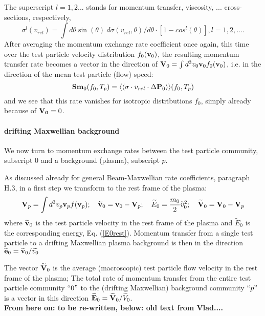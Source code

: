 \documentclass[12pt,dvipdfmx]{article}
\begin{document}
The superscript $l=1,2...$ stands for momentum transfer, viscosity,
... cross-sections, respectively,
\begin{equation}
\sigma^l(v_{rel}) = \int d\theta \sin(\theta) \ d\sigma(v_{rel},\theta)/d\theta \cdot [1-cos^l(\theta)], l=1,2,....
\end{equation}
After averaging the momentum exchange rate coefficient once again, this time over the test particle velocity distribution $f_0({\bf v}_0)$, the resulting momentum transfer rate
becomes a vector in the direction of ${\bf V}_0 = \int d^3v_0 {\bf v}_0f_0({\bf v}_0)$, i.e. in the direction of the mean test particle (flow) speed:
\begin{equation}
{\bf Sm}_0(f_0,T_p) =\langle\langle \sigma\cdot v_{rel}\cdot \Delta {\bf P}_0\rangle\rangle(f_0,T_p)
\end{equation}
and we see that this rate vanishes for isotropic distributions $f_0$, simply already because of ${\bf V_0} = 0$.
\\
\paragraph{drifting Maxwellian background}
We now turn to momentum exchange rates between the test particle community, subscript $0$ and a background (plasma), subscript $p$.

As discussed already for general Beam-Maxwellian rate coefficients, paragraph H.3, in a first step we transform to the rest frame of the plasma:
\begin{equation}
{\bf V}_p=\int d^3v_p {\bf v}_p f({\bf v}_p) ;  \quad   \widetilde{{\bf v}}_0= {\bf v}_0 - {\bf V}_p
; \quad \widetilde{E}_0=\frac{m_0}{2} \widetilde{v}_0^2
;  \quad   \widetilde{{\bf V}}_0= {\bf V}_0 - {\bf V}_p
\end{equation}
where $\widetilde{{\bf v}}_0$ is the test particle velocity in the rest frame
of the plasma and  $\widetilde{E}_0$ is the corresponding energy, Eq. (\ref{E0rest}).
Momentum transfer from a single test particle to a drifting Maxwellian plasma background is then in the direction $\widetilde{{\bf e}}_0=\widetilde{{\bf v}}_0/\widetilde{v_0}$

The vector $\widetilde{{\bf V}}_0$ is the average (macroscopic) test particle flow velocity in the rest frame of the plasma;
The total rate of momentum transfer from the entire test particle community $``0"$ to the (drifting Maxwellian) background community $``p"$
is a vector in this direction  $\widetilde{{\bf E}}_0 = \widetilde{{\bf V}}_0/\widetilde{V}_0$.\\
\textcolor[rgb]{1.00,0.00,0.00}{\textbf{From here on: to be re-written, below: old text from Vlad....}}
\end{document}
